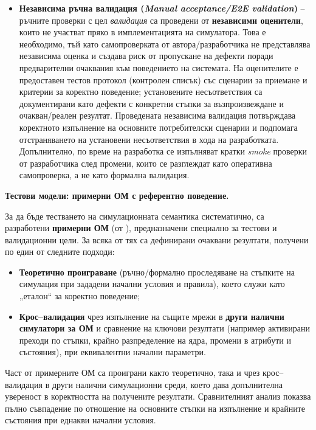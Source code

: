\begin{itemize}
    \item \textbf{Независима ръчна валидация (\textit{Manual acceptance/E2E validation})} -- ръчните проверки с цел \emph{валидация} са проведени от \textbf{независими оценители}, които не участват пряко в имплементацията на симулатора. Това е необходимо, тъй като самопроверката от автора/разработчика не представлява независима оценка и създава риск от пропускане на дефекти поради предварителни очаквания към поведението на системата. На оценителите е предоставен тестов протокол (контролен списък) със сценарии за приемане и критерии за коректно поведение; установените несъответствия са документирани като дефекти с конкретни стъпки за възпроизвеждане и очакван/реален резултат. Проведената независима валидация потвърждава коректното изпълнение на основните потребителски сценарии и подпомага отстраняването на установени несъответствия в хода на разработката. Допълнително, по време на разработка се изпълняват кратки \textit{smoke} проверки от разработчика след промени, които се разглеждат като оперативна самопроверка, а не като формална валидация.
\end{itemize}

\textbf{Тестови модели: примерни ОМ с референтно поведение.}

За да бъде тестването на симулационната семантика систематично, са разработени \textbf{примерни ОМ} (от \cite{Koycheva2002}), предназначени специално за тестови и валидационни цели. За всяка от тях са дефинирани очаквани резултати, получени по един от следните подходи:
\begin{itemize}
    \item \textbf{Теоретично проиграване} (ръчно/формално проследяване на стъпките на симулация при зададени начални условия и правила), което служи като „еталон“ за коректно поведение;
    \item \textbf{Крос--валидация} чрез изпълнение на същите мрежи в \textbf{други налични симулатори за ОМ} и сравнение на ключови резултати (например активирани преходи по стъпки, крайно разпределение на ядра, промени в атрибути и състояния), при еквивалентни начални параметри.
\end{itemize}


Част от примерните ОМ са проиграни както теоретично, така и чрез крос--валидация в други налични симулационни среди, което дава допълнителна увереност в коректността на получените резултати. Сравнителният анализ показва пълно съвпадение по отношение на основните стъпки на изпълнение и крайните състояния при еднакви начални условия.

